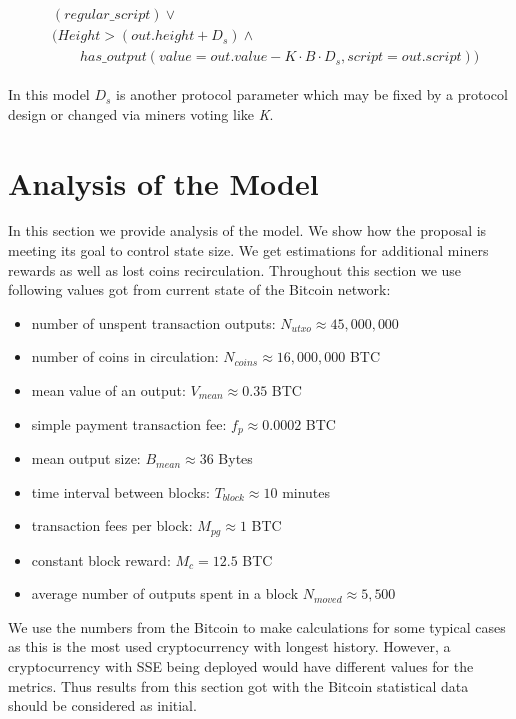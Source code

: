 \documentclass[]{llncs}   %
\begin{document}
\begin{align}
\begin{split}
&(regular\_script) \lor \\
&(Height > (out.height + D_s) \land \\  
&\qquad has\_output(value = out.value - K \cdot B \cdot D_s, script = out.script))
\end{split}
\end{align}

In this model $D_s$ is another protocol parameter which may be fixed by a protocol design or changed via miners voting like \textit{K}.

\section{Analysis of the Model}
\label{sec:analysis}

In this section we provide analysis of the model. We show how the proposal is meeting its goal to control state size. We get estimations for additional miners
rewards as well as lost coins recirculation. Throughout this section we use following values got from current state of the Bitcoin network:

\begin{itemize}
  \item number of unspent transaction outputs: $N_{utxo} \approx 45,000,000$
  \item number of coins in circulation: $N_{coins} \approx 16,000,000$ BTC
  \item mean value of an output: $V_{mean} \approx 0.35$ BTC
  \item simple payment transaction fee: $f_{p} \approx 0.0002$ BTC
  \item mean output size: $B_{mean} \approx 36$ Bytes
  \item time interval between blocks: $T_{block} \approx 10$ minutes
  \item transaction fees per block: $M_{pg} \approx 1$ BTC
  \item constant block reward: $M_c = 12.5$ BTC
  \item average number of outputs spent in a block $N_{moved} \approx 5,500$ 
\end{itemize}

We use the numbers from the Bitcoin to make calculations for some typical cases as this is the most used cryptocurrency with longest history. However, a cryptocurrency with SSE being deployed would have different values for the metrics. Thus results from this section got with the Bitcoin statistical data should be considered as initial.
\end{document}
